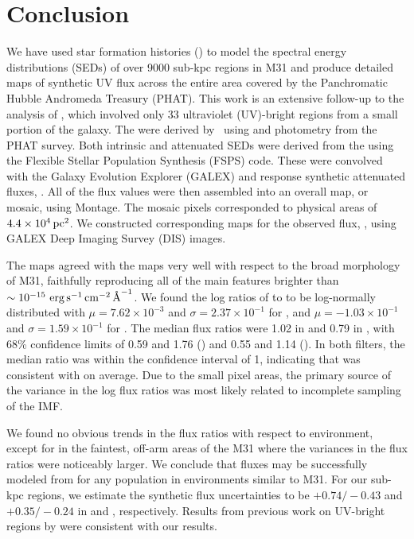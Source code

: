 \documentclass[iop, tighten]{emulateapj}
\begin{document}
\section{Conclusion}\label{mfx:conclusion}

We have used star formation histories () to model the spectral energy
distributions (SEDs) of over 9000 sub-kpc regions in M31 and produce detailed
maps of synthetic UV flux across the entire area covered by the Panchromatic
Hubble Andromeda Treasury (PHAT). This work is an extensive follow-up to the
analysis of \citet{Simones:2014}, which involved only 33 ultraviolet
(UV)-bright regions from a small portion of the galaxy. The  were
derived by \citet{Lewis:2014}\ using \acsb{} and \acsi{} photometry from the
PHAT survey. Both intrinsic and attenuated SEDs were derived from the 
using the Flexible Stellar Population Synthesis (FSPS) code. These were
convolved with the Galaxy Evolution Explorer (GALEX) \fuv{} and \nuv{} response
synthetic attenuated fluxes, \fxsfh{}. All of the flux values were then
assembled into an overall map, or mosaic, using Montage. The mosaic pixels
corresponded to physical areas of $4.4\times 10^4\,\mathrm{pc}^2$. We constructed
corresponding maps for the observed flux, \fxobs{}, using GALEX Deep Imaging
Survey (DIS) images.

The \fxsfh{} maps agreed with the \fxobs{} maps very well with respect to the
broad morphology of M31, faithfully reproducing all of the main features
brighter than $\sim 10^{-15}\, \,\mathrm{erg}\,\mathrm{s}^{-1}\,\mathrm{cm}^{-2}\,\textrm{\AA}^{-1}$. We found the log ratios of \fxsfh{} to
\fxobs{} to be log-normally distributed with $\mu = 7.62\times 10^{-3}$ and
$\sigma = 2.37\times 10^{-1}$ for \fuv{}, and $\mu = -1.03\times 10^{-1}$ and
$\sigma = 1.59\times 10^{-1}$ for \nuv{}. The median flux ratios were 1.02 in
\fuv{} and 0.79 in \nuv{}, with 68\% confidence limits of 0.59 and 1.76
(\fuv{}) and 0.55 and 1.14 (\nuv{}). In both filters, the median ratio was
within the confidence interval of 1, indicating that \fxsfh{} was consistent
with \fxobs{} on average. Due to the small pixel areas, the primary source of
the variance in the log flux ratios was most likely related to incomplete
sampling of the IMF.

We found no obvious trends in the flux ratios with respect to environment,
except for in the faintest, off-arm areas of the M31 where the variances in the
flux ratios were noticeably larger. We conclude that fluxes may be successfully
modeled from  for any population in environments similar to M31. For our
sub-kpc regions, we estimate the synthetic flux uncertainties to be
$+\!0.74/\!-\!0.43$ and $+\!0.35/\!-\!0.24$ in \fuv{} and \nuv{}, respectively.
Results from previous work on UV-bright regions by \citet{Simones:2014} were
consistent with our results.
\end{document}
